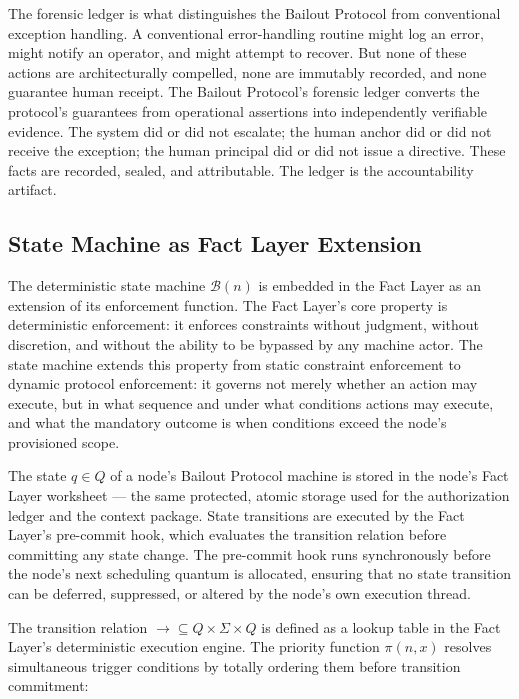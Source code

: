 The forensic ledger is what distinguishes the Bailout Protocol from conventional
exception handling. A conventional error-handling routine might log an error, might
notify an operator, and might attempt to recover. But none of these actions are
architecturally compelled, none are immutably recorded, and none guarantee human
receipt. The Bailout Protocol's forensic ledger converts the protocol's guarantees
from operational assertions into independently verifiable evidence. The system did
or did not escalate; the human anchor did or did not receive the exception; the
human principal did or did not issue a directive. These facts are recorded, sealed,
and attributable. The ledger is the accountability artifact.

\subsection{State Machine as Fact Layer Extension}
\label{sec:state-machine}

The deterministic state machine $\mathcal{B}(n)$ is embedded in the Fact Layer as
an extension of its enforcement function. The Fact Layer's core property is
deterministic enforcement: it enforces constraints without judgment, without
discretion, and without the ability to be bypassed by any machine actor. The state
machine extends this property from static constraint enforcement to dynamic protocol
enforcement: it governs not merely whether an action may execute, but in what
sequence and under what conditions actions may execute, and what the mandatory
outcome is when conditions exceed the node's provisioned scope.

The state $q \in Q$ of a node's Bailout Protocol machine is stored in the node's
Fact Layer worksheet — the same protected, atomic storage used for the authorization
ledger and the context package. State transitions are executed by the Fact Layer's
pre-commit hook, which evaluates the transition relation before committing any state
change. The pre-commit hook runs synchronously before the node's next scheduling
quantum is allocated, ensuring that no state transition can be deferred, suppressed,
or altered by the node's own execution thread.

The transition relation $\rightarrow \subseteq Q \times \Sigma \times Q$ is defined
as a lookup table in the Fact Layer's deterministic execution engine. The priority
function $\pi(n, x)$ resolves simultaneous trigger conditions by totally ordering them
before transition commitment:

